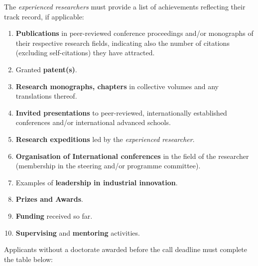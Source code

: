 \medskip\noindent
The \emph{experienced researchers} must provide a list of
achievements reflecting their track record, if applicable:
\begin{enumerate}
  \item \textbf{Publications} in peer-reviewed
  conference proceedings and/or monographs of their respective
  research fields, indicating also the number of citations
  (excluding self-citations) they have attracted.

  \item Granted \textbf{patent(s)}.

  \item \textbf{Research monographs, chapters} in collective
  volumes and any translations thereof.

  \item \textbf{Invited presentations} to peer-reviewed,
  internationally established conferences and/or international
  advanced schools.

  \item \textbf{Research expeditions} led by the {\em experienced
  researcher}.

  \item \textbf{Organisation of International conferences} in the
  field of the researcher (membership in the steering and/or
  programme committee).

  \item Examples of \textbf{leadership in industrial innovation}.

  \item \textbf{Prizes and Awards}.

  \item \textbf{Funding} received so far.

  \item \textbf{Supervising} and \textbf{mentoring} activities.
\end{enumerate}

Applicants without a doctorate awarded before the call deadline
must complete the table below:

